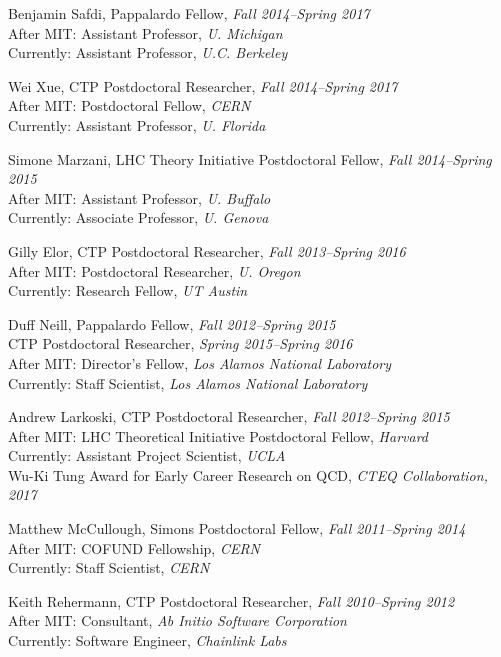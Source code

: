 \item Benjamin Safdi, Pappalardo Fellow, \emph{Fall 2014--Spring 2017}
\\ After MIT: Assistant Professor, \emph{U. Michigan}
\\ Currently: Assistant Professor, \emph{U.C. Berkeley}

\item Wei Xue, CTP Postdoctoral Researcher, \emph{Fall 2014--Spring 2017}
\\ After MIT: Postdoctoral Fellow, \emph{CERN}
\\ Currently: Assistant Professor, \emph{U. Florida}

\item Simone Marzani, LHC Theory Initiative Postdoctoral Fellow, \emph{Fall 2014--Spring 2015}
\\ After MIT: Assistant Professor, \emph{U. Buffalo}
\\ Currently: Associate Professor, \emph{U. Genova}

\item Gilly Elor, CTP Postdoctoral Researcher, \emph{Fall 2013--Spring 2016}
\\ After MIT: Postdoctoral Researcher, \emph{U. Oregon}
\\ Currently: Research Fellow, \emph{UT Austin}

\item Duff Neill, Pappalardo Fellow, \emph{Fall 2012--Spring 2015}
\\ CTP Postdoctoral Researcher, \emph{Spring 2015--Spring 2016}
\\ After MIT: Director's Fellow, \emph{Los Alamos National Laboratory}
\\ Currently: Staff Scientist, \emph{Los Alamos National Laboratory}

\item Andrew Larkoski, CTP Postdoctoral Researcher, \emph{Fall 2012--Spring 2015}
\\ After MIT: LHC Theoretical Initiative Postdoctoral Fellow, \emph{Harvard}
\\ Currently: Assistant Project Scientist, \emph{UCLA}
\\ Wu-Ki Tung Award for Early Career Research on QCD, \emph{CTEQ Collaboration, 2017}

\item Matthew McCullough, Simons Postdoctoral Fellow, \emph{Fall 2011--Spring 2014}
\\ After MIT: COFUND Fellowship, \emph{CERN}
\\ Currently: Staff Scientist, \emph{CERN}

\item Keith Rehermann, CTP Postdoctoral Researcher, \emph{Fall 2010--Spring 2012}
\\ After MIT: Consultant, \emph{Ab Initio Software Corporation}
\\ Currently: Software Engineer, \emph{Chainlink Labs}

\el
